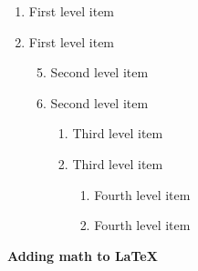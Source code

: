 \documentclass[12pt, letterpaper]{article}
\begin{document}
\begin{comment}
The default numbering scheme is:
Arabic number (1, 2, 3, ...) for Level 1
Lowercase letter (a, b, c, ...) for Level 2
Lowercase Roman numeral (i, ii, iii, ...) for Level 3
Uppercase letter (A, B, C, ...) for Level 4.

Code Description
\alph Lowercase letter (a, b, c, ...)
\Alph Uppercase letter (A, B, C, ...)
\arabic Arabic number (1, 2, 3, ...)
\roman Lowercase Roman numeral (i, ii, iii, ...)
\Roman Uppercase Roman numeral (I, II, III, ...)
\end{comment}

\renewcommand{\labelenumii}{\Roman{enumii}}	%
\begin{enumerate}
	\item First level item
	\item First level item
	\begin{enumerate}
		\setcounter{enumii}{4}	%
		\item Second level item
		\item Second level item
		\begin{enumerate}
			\item Third level item
			\item Third level item
			\begin{enumerate}
				\item Fourth level item
				\item Fourth level item
			\end{enumerate}
		\end{enumerate}
	\end{enumerate}
\end{enumerate}

\begin{comment}
It is possible to change the labels of any level, replace labelenumii for one of the listed below.
\theenumi for Level 1
\theenumii for Level 2
\theenumiii for Level 3
\theenumiv for Level 4
\end{comment}

\textbf{Adding math to LaTeX}
\end{document}
